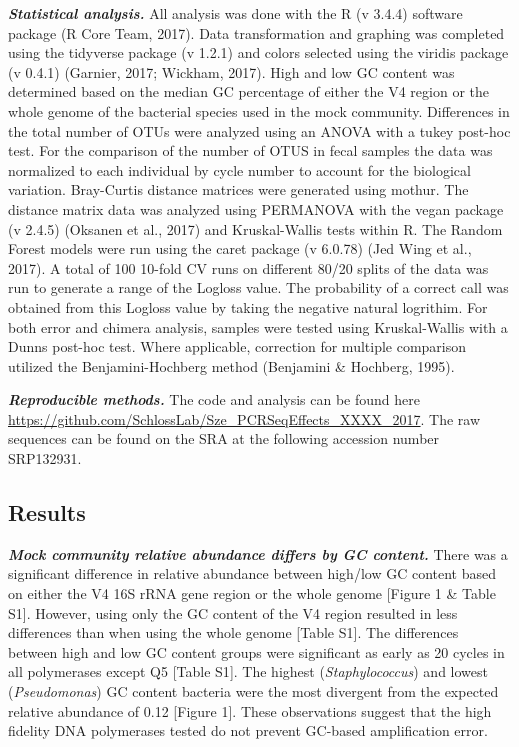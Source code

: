 \documentclass[11pt,]{article}
\begin{document}
\textbf{\emph{Statistical analysis.}} All analysis was done with the R
(v 3.4.4) software package (R Core Team, 2017). Data transformation and
graphing was completed using the tidyverse package (v 1.2.1) and colors
selected using the viridis package (v 0.4.1) (Garnier, 2017; Wickham,
2017). High and low GC content was determined based on the median GC
percentage of either the V4 region or the whole genome of the bacterial
species used in the mock community. Differences in the total number of
OTUs were analyzed using an ANOVA with a tukey post-hoc test. For the
comparison of the number of OTUS in fecal samples the data was
normalized to each individual by cycle number to account for the
biological variation. Bray-Curtis distance matrices were generated using
mothur. The distance matrix data was analyzed using PERMANOVA with the
vegan package (v 2.4.5) (Oksanen et al., 2017) and Kruskal-Wallis tests
within R. The Random Forest models were run using the caret package (v
6.0.78) (Jed Wing et al., 2017). A total of 100 10-fold CV runs on
different 80/20 splits of the data was run to generate a range of the
Logloss value. The probability of a correct call was obtained from this
Logloss value by taking the negative natural logrithim. For both error
and chimera analysis, samples were tested using Kruskal-Wallis with a
Dunns post-hoc test. Where applicable, correction for multiple
comparison utilized the Benjamini-Hochberg method (Benjamini \&
Hochberg, 1995).

\textbf{\emph{Reproducible methods.}} The code and analysis can be found
here \url{https://github.com/SchlossLab/Sze_PCRSeqEffects_XXXX_2017}.
The raw sequences can be found on the SRA at the following accession
number SRP132931.

\newpage

\subsection{Results}\label{results}

\textbf{\emph{Mock community relative abundance differs by GC content.}}
There was a significant difference in relative abundance between
high/low GC content based on either the V4 16S rRNA gene region or the
whole genome {[}Figure 1 \& Table S1{]}. However, using only the GC
content of the V4 region resulted in less differences than when using
the whole genome {[}Table S1{]}. The differences between high and low GC
content groups were significant as early as 20 cycles in all polymerases
except Q5 {[}Table S1{]}. The highest (\emph{Staphylococcus}) and lowest
(\emph{Pseudomonas}) GC content bacteria were the most divergent from
the expected relative abundance of 0.12 {[}Figure 1{]}. These
observations suggest that the high fidelity DNA polymerases tested do
not prevent GC-based amplification error.
\end{document}
